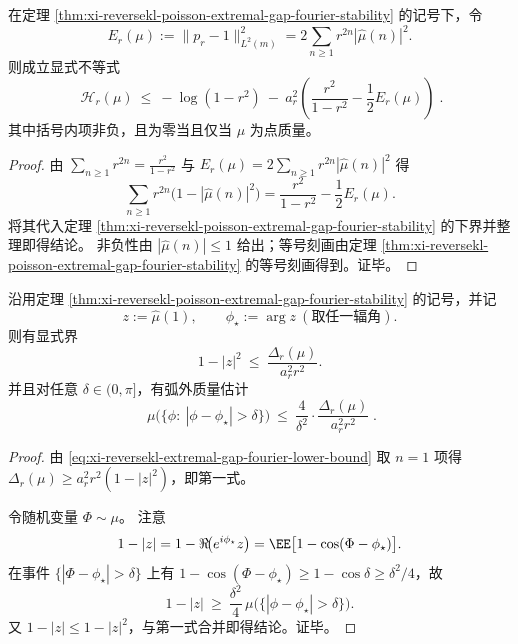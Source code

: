 

\begin{corollary}\label{cor:xi-reversekl-extremal-gap-energy-correction}
在定理 \ref{thm:xi-reversekl-poisson-extremal-gap-fourier-stability} 的记号下，令
\[
E_r(\mu):=\|p_r-1\|_{L^2(m)}^2=2\sum_{n\ge 1}r^{2n}|\widehat\mu(n)|^2.
\]
则成立显式不等式
\[
\boxed{\;
\mathcal H_r(\mu)\ \le\ -\log(1-r^2)\ -\ a_r^2\left(\frac{r^2}{1-r^2}-\frac12E_r(\mu)\right)\; }.
\]
其中括号内项非负，且为零当且仅当 \(\mu\) 为点质量。
\end{corollary}
\begin{proof}
由 \(\sum_{n\ge 1}r^{2n}=\frac{r^2}{1-r^2}\) 与 \(E_r(\mu)=2\sum_{n\ge 1}r^{2n}|\widehat\mu(n)|^2\) 得
\[
\sum_{n\ge 1}r^{2n}\bigl(1-|\widehat\mu(n)|^2\bigr)
=\frac{r^2}{1-r^2}-\frac12E_r(\mu).
\]
将其代入定理 \ref{thm:xi-reversekl-poisson-extremal-gap-fourier-stability} 的下界并整理即得结论。
非负性由 \(|\widehat\mu(n)|\le 1\) 给出；等号刻画由定理 \ref{thm:xi-reversekl-poisson-extremal-gap-fourier-stability} 的等号刻画得到。证毕。
\end{proof}

\begin{proposition}[熵缺口诱导的定量聚集与弧外质量界]\label{prop:xi-reversekl-extremal-gap-concentration-arc}
沿用定理 \ref{thm:xi-reversekl-poisson-extremal-gap-fourier-stability} 的记号，并记
\[
z:=\widehat\mu(1),\qquad \phi_\star:=\arg z\ (\text{取任一辐角}).
\]
则有显式界
\[
1-|z|^2\ \le\ \frac{\Delta_r(\mu)}{a_r^2 r^2}.
\]
并且对任意 \(\delta\in(0,\pi]\)，有弧外质量估计
\[
\boxed{\;
\mu\bigl(\{\phi:\ |\phi-\phi_\star|>\delta\}\bigr)
\ \le\
\frac{4}{\delta^2}\cdot \frac{\Delta_r(\mu)}{a_r^2 r^2}\; }.
\]
\end{proposition}
\begin{proof}
由 \eqref{eq:xi-reversekl-extremal-gap-fourier-lower-bound} 取 \(n=1\) 项得
\(
\Delta_r(\mu)\ge a_r^2 r^2(1-|z|^2)
\)，即第一式。
\par
令随机变量 \(\Phi\sim\mu\)。
注意
\[
1-|z|
=1-\Re\!\bigl(e^{i\phi_\star}z\bigr)
=\EE\bigl[1-\cos(\Phi-\phi_\star)\bigr].
\]
在事件 \(\{|\Phi-\phi_\star|>\delta\}\) 上有 \(1-\cos(\Phi-\phi_\star)\ge 1-\cos\delta\ge \delta^2/4\)，故
\[
1-|z|\ \ge\ \frac{\delta^2}{4}\,\mu\bigl(\{|\phi-\phi_\star|>\delta\}\bigr).
\]
又 \(1-|z|\le 1-|z|^2\)，与第一式合并即得结论。证毕。
\end{proof}

